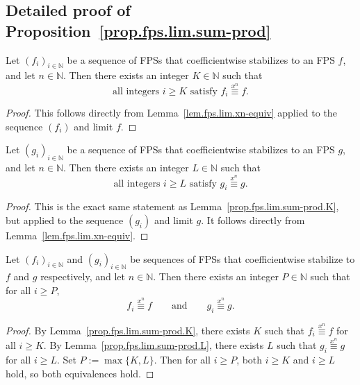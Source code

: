 \subsection{Detailed proof of Proposition~\ref{prop.fps.lim.sum-prod}}

\begin{lemma}
\label{prop.fps.lim.sum-prod.K}
\leantarget
\leanok
Let $(f_i)_{i\in\mathbb{N}}$ be a sequence of FPSs that coefficientwise
stabilizes to an FPS $f$, and let $n\in\mathbb{N}$. Then there exists
an integer $K\in\mathbb{N}$ such that
\[
\text{all integers } i\geq K \text{ satisfy }
f_i \overset{x^n}{\equiv} f.
\]
\end{lemma}

\begin{proof}
\leanok
This follows directly from Lemma~\ref{lem.fps.lim.xn-equiv}
applied to the sequence $(f_i)$ and limit $f$.
\end{proof}

\begin{lemma}
\label{prop.fps.lim.sum-prod.L}
\leantarget
\leanok
Let $(g_i)_{i\in\mathbb{N}}$ be a sequence of FPSs that coefficientwise
stabilizes to an FPS $g$, and let $n\in\mathbb{N}$. Then there exists
an integer $L\in\mathbb{N}$ such that
\[
\text{all integers } i\geq L \text{ satisfy }
g_i \overset{x^n}{\equiv} g.
\]
\end{lemma}

\begin{proof}
\leanok
This is the exact same statement as
Lemma~\ref{prop.fps.lim.sum-prod.K}, but applied to the sequence
$(g_i)$ and limit $g$. It follows directly from
Lemma~\ref{lem.fps.lim.xn-equiv}.
\end{proof}

\begin{lemma}
\label{prop.fps.lim.sum-prod.both}
\leanhelper
\leanok
Let $(f_i)_{i\in\mathbb{N}}$ and $(g_i)_{i\in\mathbb{N}}$ be sequences
of FPSs that coefficientwise stabilize to $f$ and $g$ respectively, and
let $n\in\mathbb{N}$. Then there exists an integer $P\in\mathbb{N}$
such that for all $i\geq P$,
\[
f_i \overset{x^n}{\equiv} f
\qquad\text{and}\qquad
g_i \overset{x^n}{\equiv} g.
\]
\end{lemma}

\begin{proof}
\leanok
By Lemma~\ref{prop.fps.lim.sum-prod.K}, there exists $K$ such that
$f_i \overset{x^n}{\equiv} f$ for all $i\geq K$.
By Lemma~\ref{prop.fps.lim.sum-prod.L}, there exists $L$ such that
$g_i \overset{x^n}{\equiv} g$ for all $i\geq L$.
Set $P := \max\{K, L\}$. Then for all $i\geq P$, both
$i\geq K$ and $i\geq L$ hold, so both equivalences hold.
\end{proof}

